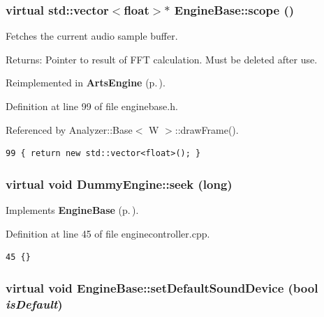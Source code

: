 \subsubsection{\setlength{\rightskip}{0pt plus 5cm}virtual std::vector$<$float$>$$\ast$ Engine\-Base::scope ()\hspace{0.3cm}{\tt  [inline, virtual, inherited]}}\label{classEngineBase_EngineBasea14}


Fetches the current audio sample buffer. \begin{Desc}
\item[Returns:]Pointer to result of FFT calculation. Must be deleted after use. \end{Desc}


Reimplemented in {\bf Arts\-Engine} {\rm (p.\,\pageref{classArtsEngine_ArtsEnginea9})}.

Definition at line 99 of file enginebase.h.

Referenced by Analyzer::Base$<$ W $>$::draw\-Frame().



\footnotesize\begin{verbatim}99 { return new std::vector<float>(); }
\end{verbatim}\normalsize 
{}
\subsubsection{\setlength{\rightskip}{0pt plus 5cm}virtual void Dummy\-Engine::seek (long)\hspace{0.3cm}{\tt  [inline, private, virtual]}}\label{classDummyEngine_DummyEngined11}




Implements {\bf Engine\-Base} {\rm (p.\,\pageref{classEngineBase_EngineBasei5})}.

Definition at line 45 of file enginecontroller.cpp.



\footnotesize\begin{verbatim}45 {}
\end{verbatim}\normalsize 
{}
\subsubsection{\setlength{\rightskip}{0pt plus 5cm}virtual void Engine\-Base::set\-Default\-Sound\-Device (bool {\em is\-Default})\hspace{0.3cm}{\tt  [inline, virtual, inherited]}}\label{classEngineBase_EngineBasea27}




